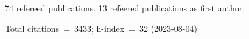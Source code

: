 74 refereed publications. 13 refeered publications as first author.

Total citations~=~3433; h-index~=~32 (2023-08-04)